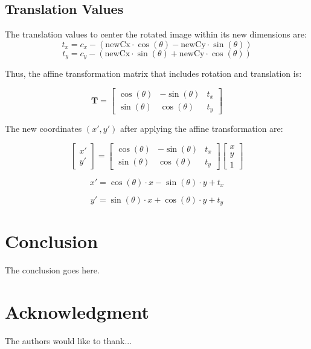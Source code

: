 \documentclass[conference]{IEEEtran}
\begin{document}
\subsection*{Translation Values}
The translation values to center the rotated image within its new dimensions are:
\[
t_x = c_x - (\text{newCx} \cdot \cos(\theta) - \text{newCy} \cdot \sin(\theta))
\]
\[
t_y = c_y - (\text{newCx} \cdot \sin(\theta) + \text{newCy} \cdot \cos(\theta))
\]

Thus, the affine transformation matrix that includes rotation and translation is:

\[
\mathbf{T} = \begin{bmatrix}
\cos(\theta) & -\sin(\theta) & t_x \\
\sin(\theta) & \cos(\theta) & t_y
\end{bmatrix}
\]

The new coordinates \((x', y')\) after applying the affine transformation are:

\[
\begin{bmatrix}
x' \\
y'
\end{bmatrix}
=
\begin{bmatrix}
\cos(\theta) & -\sin(\theta) & t_x \\
\sin(\theta) & \cos(\theta) & t_y
\end{bmatrix}
\begin{bmatrix}
x \\
y \\
1
\end{bmatrix}
\]

\[
x' = \cos(\theta) \cdot x - \sin(\theta) \cdot y + t_x
\]

\[
y' = \sin(\theta) \cdot x + \cos(\theta) \cdot y + t_y
\]



\section{Conclusion}
The conclusion goes here.






\section*{Acknowledgment}


The authors would like to thank...








  
 

\end{document}
